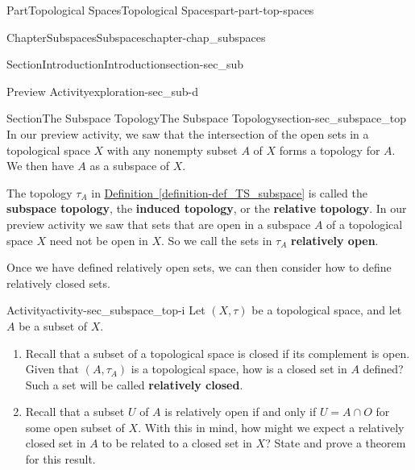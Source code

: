 \documentclass[oneside,10pt,]{book}
\newcommand{\xreffont}{\relax}
\newcommand{\terminology}[1]{\textbf{#1}}
\numberwithin{equation}{chapter}
\begin{document}
\begin{partptx}{Part}{Topological Spaces}{}{Topological Spaces}{}{}{part-part-top-spaces}
\begin{chapterptx}{Chapter}{Subspaces}{}{Subspaces}{}{}{chapter-chap_subspaces}
\begin{sectionptx}{Section}{Introduction}{}{Introduction}{}{}{section-sec_sub}
\begin{exploration}{Preview Activity}{}{exploration-sec_sub-d}
\begin{enumerate}[font=\bfseries,label=(\alph*),ref=\alph*]
\begin{enumerate}[font=\bfseries,label=(\roman*),ref=\theenumi.\roman*]
\end{enumerate}%
\end{enumerate}%
\end{exploration}%
\end{sectionptx}
%
%
\typeout{************************************************}
\typeout{************************************************}
%
\begin{sectionptx}{Section}{The Subspace Topology}{}{The Subspace Topology}{}{}{section-sec_subspace_top}
%
%
%
%
In our preview activity, we saw that the intersection of the open sets in a topological space \(X\) with any nonempty subset \(A\) of \(X\) forms a topology for \(A\). We then have \(A\) as a subspace of \(X\).%
\par
The topology \(\tau_A\) in \hyperref[definition-def_TS_subspace]{Definition~{\xreffont\ref{definition-def_TS_subspace}}} is called the \terminology{subspace topology}, the \terminology{induced topology}, or the \terminology{relative topology}. In our preview activity we saw that sets that are open in a subspace \(A\) of a topological space \(X\) need not be open in \(X\). So we call the sets in \(\tau_A\) \terminology{relatively open}.%
\par
Once we have defined relatively open sets, we can then consider how to define relatively closed sets.%
\begin{activity}{Activity}{}{activity-sec_subspace_top-i}%
Let \((X, \tau)\) be a topological space, and let \(A\) be a subset of \(X\).%
\begin{enumerate}[font=\bfseries,label=(\alph*),ref=\alph*]%
\item{}Recall that a subset of a topological space is closed if its complement is open. Given that \((A, \tau_A)\) is a topological space, how is a closed set in \(A\) defined? Such a set will be called \terminology{relatively closed}.%
\item{}Recall that a subset \(U\) of \(A\) is relatively open if and only if \(U = A \cap O\) for some open subset of \(X\). With this in mind, how might we expect a relatively closed set in \(A\) to be related to a closed set in \(X\)? State and prove a theorem for this result.%
\end{enumerate}%
\end{activity}%
\end{sectionptx}
%
%
\typeout{************************************************}

\end{chapterptx}
\end{partptx}
\end{document}
